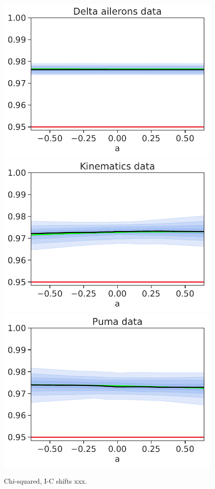\begin{figure}[h!]
    \\
    \includegraphics[width=0.3\linewidth]{figs/uci/delta_coverage_Chi-squared_I-C.pdf}
    \hfill
    \includegraphics[width=0.3\linewidth]{figs/uci/kin_coverage_Chi-squared_I-C.pdf}
    \hfill
    \includegraphics[width=0.3\linewidth]{figs/uci/puma_coverage_Chi-squared_I-C.pdf}  
    \caption{Chi-squared, I-C shifts xxx.}
    \label{fig:xxx}
\end{figure}
